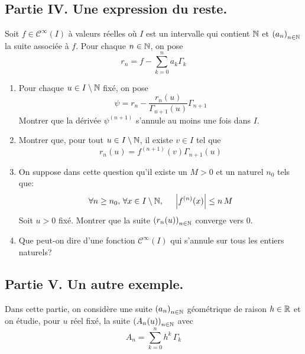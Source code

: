 \subsection*{Partie IV. Une expression du reste.}
Soit $f\in \mathcal{C}^{\infty}(I)$ à valeurs réelles où $I$ est un intervalle qui contient $\mathbb{N}$ et $\left( a_n\right) _{n\in \mathbb{N}}$ la suite associée à $f$. Pour chaque $n\in \mathbb{N}$, on pose
\begin{displaymath}
 r_n = f - \sum_{k=0}^na_k\Gamma_k
\end{displaymath}
\begin{enumerate}
 \item Pour chaque $u\in I\setminus \mathbb{N}$ fixé, on pose
\begin{displaymath}
 \psi = r_n - \frac{r_n(u)}{\Gamma_{n+1}(u)}\Gamma_{n+1}
\end{displaymath}
Montrer que la dérivée $\psi^{(n+1)}$ s'annule au moins une fois dans $I$.
\item Montrer que, pour tout $u\in I\setminus \mathbb{N}$, il existe $v\in I$ tel que 
\begin{displaymath}
 r_n(u) = f^{(n+1)}(v)\Gamma_{n+1}(u)
\end{displaymath}
\item On suppose dans cette question qu'il existe un $M>0$ et un naturel $n_0$ tels que:
\begin{displaymath}
\forall n\geq n_0, \,\forall x\in I\setminus \mathbb{N},\hspace{0.5cm} \left|f^{(n)}(x)\right| \leq n\,M 
\end{displaymath}
Soit $u>0$ fixé. Montrer que la suite $\left( r_n(u)\right)_{n\in \mathbb{N}}$ converge vers $0$.

\item Que peut-on dire d'une fonction $\mathcal{C}^{\infty}(I)$ qui s'annule sur tous les entiers naturels?
\end{enumerate}

\subsection*{Partie V. Un autre exemple.}
Dans cette partie, on considère une suite $\left( a_n\right) _{n\in \mathbb{N}}$ géométrique de raison $h\in \mathbb{R}$ et on étudie, pour $u$ réel fixé, la suite $\left( A_n(u)\right) _{n\in \mathbb{N}}$ avec 
\begin{displaymath}
 A_n = \sum_{k=0}^{n}h^k \,\Gamma_k
\end{displaymath}

